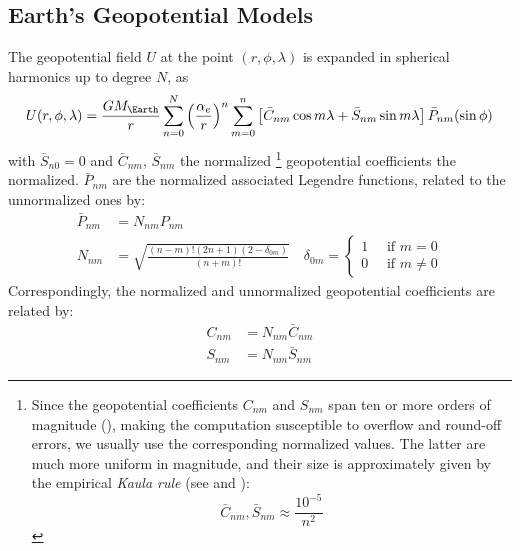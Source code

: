 {\subsection{Earth's Geopotential Models}
The geopotential field $U$ at the point $(r, \phi , \lambda )$ is expanded in 
spherical harmonics up to degree $N$, as
\begin{equation}
  \label{eq:iers201061}
  U(r, \phi , \lambda ) = \frac{G M_{\Earth}}{r} \sum_{n=0}^N 
    {\left(\frac{\alpha _e}{r}\right)}^n 
     \sum_{m=0}^n \left[ \bar{C}_{nm} \cos {m \lambda} + \bar{S}_{nm} \sin{m \lambda} \right] 
     \bar{P}_{nm}( \sin \phi )
\end{equation}
with $\bar{S}_{n0} = 0$ and $\bar{C}_{nm}$, $\bar{S}_{nm}$ the normalized
\footnote{Since the geopotential coefficients $C_{nm}$ and $S_{nm}$ span ten or 
more orders of magnitude (\cite{Montenbruck2000}), making the computation 
susceptible to overflow and round-off errors, we usually use the corresponding 
normalized values. The latter are much more uniform in magnitude, and their 
size is approximately given by the empirical \emph{Kaula rule} (see 
\cite{Montenbruck2000} and \cite{Kaula2000}):
\begin{equation} \bar{C}_{nm} , \bar{S}_{nm} \approx \frac{10^{-5}}{n^2} \end{equation}}
geopotential coefficients the normalized. $\bar{P}_{nm}$ are the normalized 
associated Legendre functions, related to the unnormalized ones by:
\begin{subequations}
  \begin{align}
    \bar{P}_{nm} &= N_{nm} P_{nm} \label{eq:iers201062a} \\
    N_{nm} &= \sqrt{\frac{(n-m)!(2n+1)(2-\delta _{0m})}{(n+m)!}} 
      \quad \delta _{0m} = 
        \begin{cases}
          1 \quad \text{ if } m = 0 \\
          0 \quad \text{ if } m \neq 0
        \end{cases}
        \label{eq:iers201062b}
  \end{align}
\end{subequations}
Correspondingly, the normalized and unnormalized geopotential coefficients are 
related by:
\begin{subequations}
  \begin{align}
    C_{nm} &= N_{nm} \bar{C}_{nm} \\
    S_{nm} &= N_{nm} \bar{S}_{nm}
  \end{align}
\end{subequations}

}
